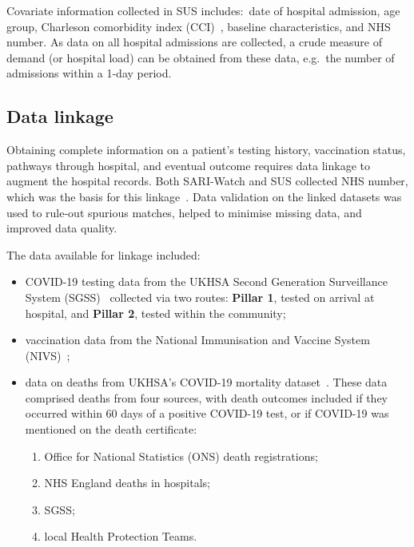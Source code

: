 Covariate information collected in SUS includes:\ date of hospital admission, age group, Charleson comorbidity index (CCI)~\parencite{Charlson1987-nz}, baseline characteristics, and NHS number. As data on all hospital admissions are collected, a crude measure of demand (or hospital load) can be obtained from these data, e.g.\ the number of admissions within a 1-day period.

\subsection{Data linkage}

Obtaining complete information on a patient's testing history, vaccination status, pathways through hospital, and eventual outcome requires data linkage to augment the hospital records. Both SARI-Watch and SUS collected NHS number, which was the basis for this linkage~\parencite{Bhattacharya2021-wq}. Data validation on the linked datasets was used to rule-out spurious matches, helped to minimise missing data, and improved data quality.

The data available for linkage included:
%
\begin{itemize}
    \item COVID-19 testing data from the UKHSA Second Generation Surveillance System (SGSS)~\parencite{NHS-Digital2024-pu} collected via two routes: \textbf{Pillar 1}, tested on arrival at hospital, and \textbf{Pillar 2}, tested within the community;
    \item vaccination data from the National Immunisation and Vaccine System (NIVS)~\parencite{NHS-Digital2022-vd};
    \item data on deaths from UKHSA's COVID-19 mortality dataset~\parencite{Covid-19_EpiCell2020-uv}. These data comprised deaths from four sources, with death outcomes included if they occurred within 60 days of a positive COVID-19 test, or if COVID-19 was mentioned on the death certificate:
          \begin{enumerate}
              \item Office for National Statistics (ONS) death registrations;
              \item NHS England deaths in hospitals;
              \item SGSS;
              \item local Health Protection Teams.
          \end{enumerate}
\end{itemize}

